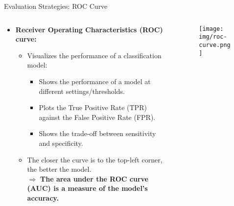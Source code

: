 \begin{frame}{Evaluation Strategies: ROC Curve}
	\vspace*{-1.5em}
	\begin{columns}
		\begin{column}{0.6\textwidth}
			\begin{itemize}
				\item \textbf{Receiver Operating Characteristics (ROC) curve:}
				      \begin{itemize}
					      \item Visualizes the performance of a classification model:
					            \begin{itemize}
						            \item Shows the performance of a model at different settings/thresholds.
						            \item Plots the True Positive Rate (TPR) \\ against the False Positive Rate (FPR).
						            \item Shows the trade-off between sensitivity and specificity.
					            \end{itemize}
					      \item The closer the curve is to the top-left corner, the better the model. \\
					            $\Rightarrow$ \textbf{\color{airforceblue}The area under the ROC curve (AUC) is a measure of the model's accuracy.}
				      \end{itemize}


			\end{itemize}
		\end{column}
		\begin{column}{0.4\textwidth}
			\vspace*{-1.5em}
			\begin{figure}
				\centering
				\texttt{[image: img/roc-curve.png]}
			\end{figure}
			\vspace*{-0.5em}
		\end{column}
	\end{columns}
\end{frame}
